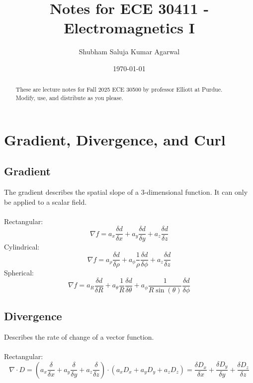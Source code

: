 \documentclass[nobib]{tufte-handout}
\title{Notes for ECE 30411 - Electromagnetics I}
\author[Shubham Saluja Kumar Agarwal]{Shubham Saluja Kumar Agarwal}
\date{\today}  %
\begin{document}
\maketitle

\begin{abstract}
    These are lecture notes for Fall 2025 ECE 30500 by professor Elliott at Purdue. Modify, use, and distribute as you please.
\end{abstract}

\tableofcontents

\newpage

\section{Gradient, Divergence, and Curl}
\subsection{Gradient}
The gradient describes the spatial slope of a 3-dimensional function. It can only be applied to a scalar field.\\~\\
Rectangular:
\begin{equation*}
    \nabla f = a_x \frac{\delta d}{\delta x}+a_y \frac{\delta d}{\delta y}+a_z \frac{\delta d}{\delta z}
\end{equation*}
Cylindrical:
\begin{equation*}
    \nabla f = a_\rho \frac{\delta d}{\delta \rho}+a_\phi \frac{1}{\rho}\frac{\delta d}{\delta \phi}+a_z \frac{\delta d}{\delta z}
\end{equation*}
Spherical:
\begin{equation*}
    \nabla f = a_R \frac{\delta d}{\delta R}+a_\theta \frac{1}{R}\frac{\delta d}{\delta \theta}+a_\phi \frac{1}{R\sin(\theta)}\frac{\delta d}{\delta \phi}
\end{equation*}
\subsection{Divergence}
Describes the rate of change of a vector function.\\~\\
Rectangular:
\begin{equation*}
    \nabla \cdot D = \left(a_x \frac{\delta}{\delta x}+a_y \frac{\delta}{\delta y}+a_z \frac{\delta}{\delta z}\right)\cdot \left(a_x D_x +a_y D_y + a_z D_z\right) = \frac{\delta D_x}{\delta x}+\frac{\delta D_y}{\delta y}+\frac{\delta D_z}{\delta z}
\end{equation*}
\end{document}
